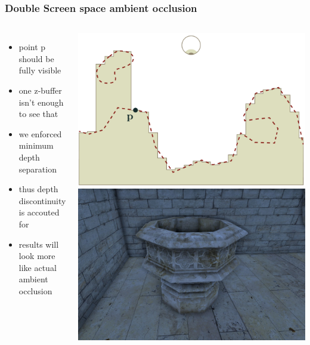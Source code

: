 \documentclass[aspectratio=169]{beamer}
\begin{document}
	\begin{frame}
		\frametitle{Double Screen space ambient occlusion}
		\begin{columns}
				\begin{itemize}
					\item point p should be fully visible
					\item one z-buffer isn't enough to see that
					\item we enforced minimum depth separation
					\item thus depth discontinuity is accouted for
					\item results will look more like actual ambient occlusion
					
				\end{itemize}
				\includegraphics[height=.65\textwidth]{img/ambient_occlusion_depth_discontinuity.png}
				\includegraphics[height=.65\textwidth]{img/screen_space_ambient_occlusion_halo.png}
		\end{columns}		
	\end{frame}	
\end{document}
